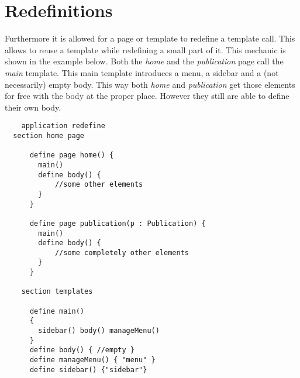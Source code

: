 \section{Redefinitions}
Furthermore it is allowed for a page or template to redefine a template call. This allows to reuse a template while redefining a small part of it. This mechanic is shown in the example below. Both the \emph{home} and the \emph{publication} page call the \emph{main} template. This main template introduces a menu, a sidebar and a (not necessarily) empty body. This way both \emph{home} and \emph{publication} get those elements for free with the body at the proper place. However they still are able to define their own body. 

\begin{lstlisting}
	application redefine
  section home page

      define page home() {
        main()
        define body() {
        	//some other elements
        }
      }

      define page publication(p : Publication) {
        main()
        define body() {
        	//some completely other elements
        }
      }

    section templates 

      define main() 
      { 
        sidebar() body() manageMenu() 
      }  
      define body() { //empty }
      define manageMenu() { "menu" }
      define sidebar() {"sidebar"}

\end{lstlisting}
